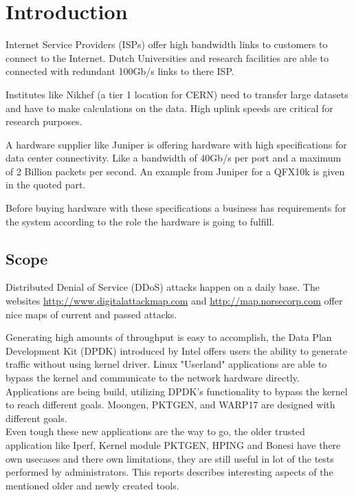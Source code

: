 \chapter{Introduction}\label{ch:intro}
Internet Service Providers (ISPs) offer high bandwidth links to customers to connect to the Internet. Dutch Universities and research facilities are able to connected with redundant 100Gb/s links to there ISP.

Institutes like Nikhef (a tier 1 location for CERN) need to transfer large datasets and have to make calculations on the data. High uplink speeds are critical for research purposes.

A hardware supplier like Juniper is offering hardware with high specifications for data center connectivity. Like a bandwidth of 40Gb/s per port and a maximum of 2 Billion packets per second. An example from Juniper for a QFX10k is given in the quoted part. 


Before buying hardware with these specifications a business has requirements for the system according to the role the hardware is going to fulfill.

\section{Scope}\label{sec:scope}
Distributed Denial of Service (DDoS) attacks happen on a daily base. The websites \url{http://www.digitalattackmap.com} and \url{http://map.norsecorp.com} offer nice maps of current and passed attacks. 

Generating high amounts of throughput is easy to accomplish, the Data Plan Development Kit (DPDK) introduced by Intel offers users the ability to generate traffic without using kernel driver. 
Linux "Userland" applications are able to bypass the kernel and communicate to the network hardware directly.
Applications are being build, utilizing DPDK's functionality to bypass the kernel to reach different goals. Moongen, PKTGEN, and WARP17 are designed with different goals. \\
Even tough these new applications are the way to go, the older trusted application like Iperf, Kernel module PKTGEN, HPING and Bonesi have there own usecases and there own limitations, they are still useful in lot of the tests performed by administrators. 
This reports describes interesting aspects of the mentioned older and newly created tools.

